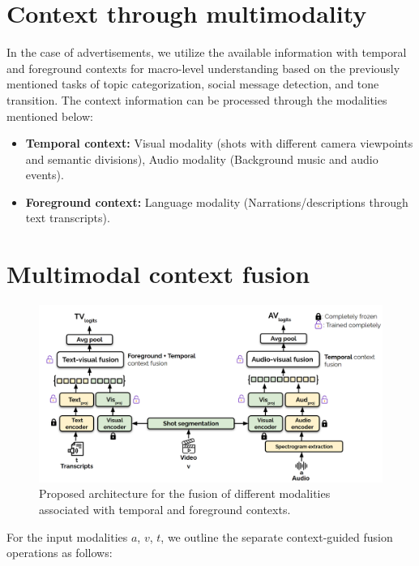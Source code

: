 \section{Context through multimodality}
In the case of advertisements, we utilize the available information with temporal and foreground contexts for macro-level understanding based on the previously mentioned tasks of topic categorization, social message detection, and tone transition. The context information can be processed through the modalities mentioned below:
\begin{itemize}
    \item \textbf{Temporal context:} Visual modality (shots with different camera viewpoints and semantic divisions), Audio modality 
      (Background music and audio events).
    \item \textbf{Foreground context:} Language modality (Narrations/descriptions through text transcripts).
\end{itemize}

\section{Multimodal context fusion}
\begin{figure}[h!]
     \centering
     \includegraphics[width=\textwidth]{figures/ads_modeling_structure.png}
    \caption{Proposed architecture for the fusion of different modalities associated with temporal and foreground contexts. }
\end{figure}
For the input modalities $a$, $v$, $t$, we outline the separate context-guided fusion operations as follows:
